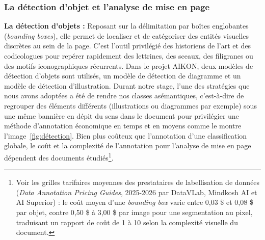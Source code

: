 \subsubsection{La détection d'objet et l'analyse de mise en page}
    
\begin{description}
    
    \item \textbf{La détection d'objets :} Reposant sur la délimitation par boîtes englobantes (\textit{bounding boxes}), elle permet de localiser et de catégoriser des entités visuelles discrètes au sein de la page. C'est l'outil privilégié des historiens de l'art et des codicologues pour repérer rapidement des lettrines, des sceaux, des filigranes ou des motifs iconographiques récurrents. Dans le projet AIKON, deux modèles de détection d'objets sont utilisés, un modèle de détection de diagramme et un modèle de détection d'illustration. Durant notre stage, l'une des stratégies que nous avons adoptées a été de rendre nos classes \og asémantiques\fg, c'est-à-dire de regrouper des éléments différents (illustrations ou diagrammes par exemple) sous une même bannière en dépit du sens dans le document pour privilégier une méthode d'annotation économique en temps et en moyens comme le montre l'image~\ref{fig:détection}. Bien plus coûteux que l'annotation d'une classification globale, le coût et la complexité de l'annotation pour l'analyse de mise en page dépendent des documents étudiés\footnote{Voir les grilles tarifaires moyennes des prestataires de labellisation de données (\textit{Data Annotation Pricing Guides}, 2025-2026 par DataVLab, Mindkosh AI et AI Superior) : le coût moyen d'une \textit{bounding box} varie entre 0,03 \$ et 0,08 \$ par objet, contre 0,50 \$ à 3,00 \$ par image pour une segmentation au pixel, traduisant un rapport de coût de 1 à 10 selon la complexité visuelle du document.}. 
    

\end{description}
